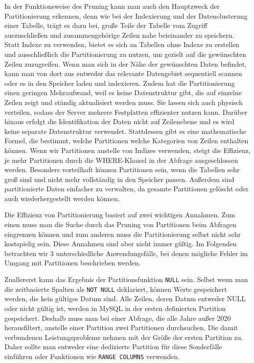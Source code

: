 In der Funktionsweise des Pruning kann man auch den Hauptzweck der Partitionierung erkennen, denn wie bei der Indexierung und der Datenclusterung einer Tabelle, trägt es dazu bei, große Teile der Tabelle vom Zugriff auszuschließen und zusammengehörige Zeilen nahe beieinander zu speichern.
Statt Indexe zu verwenden, bietet es sich an Tabellen ohne Indexe zu erstellen und ausschließlich die Partitionierung zu nutzen, um gezielt auf die gewünschten Zeilen zuzugreifen.
Wenn man sich in der Nähe der gewünschten Daten befindet, kann man von dort aus entweder das relevante Datengebiet sequentiell scannen oder es in den Speicher laden und indexieren.
Zudem hat die Partitionierung einen geringen Mehraufwand, weil es keine Datenstruktur gibt, die auf einzelne Zeilen zeigt und ständig aktualisiert werden muss.
Sie lassen sich auch physisch verteilen, sodass der Server mehrere Festplatten effizienter nutzen kann.
Darüber hinaus erfolgt die Identifikation der Daten nicht auf Zeilenebene und es wird keine separate Datenstruktur verwendet.
Stattdessen gibt es eine mathematische Formel, die bestimmt, welche Partitionen welche Kategorien von Zeilen enthalten können.
Wenn wir Partitionen anstelle von Indizes verwenden, steigt die Effizienz, je mehr Partitionen durch die WHERE-Klausel in der Abfrage ausgeschlossen werden.
Besonders vorteilhaft können Partitionen sein, wenn die Tabellen sehr groß sind und nicht mehr vollständig in den Speicher passen.
Außerdem sind partitionierte Daten einfacher zu verwalten, da gesamte Partitionen gelöscht oder auch wiederhergestellt werden können.

Die Effizienz von Partitionierung basiert auf zwei wichtigen Annahmen.
Zum einen muss man die Suche durch das Pruning von Partitionen beim Abfragen eingrenzen können und zum anderen muss die Partitionierung selbst nicht sehr kostspielig sein.
Diese Annahmen sind aber nicht immer gültig.
Im Folgenden betrachten wir 3 unterschiedliche Anwendungsfälle, bei denen mögliche Fehler im Umgang mit Partitionen beschrieben werden.

Zuallererst kann das Ergebnis der Partitionsfunktion \texttt{NULL} sein.
Selbst wenn man die zeitbasierte Spalten als \texttt{NOT NULL} deklariert, können Werte gespeichert werden, die kein gültiges Datum sind.
Alle Zeilen, deren Datum entweder NULL oder nicht gültig ist, werden in MySQL in der ersten definierten Partition gespeichert.
Deshalb muss man bei einer Abfrage, die alle Jahre außer 2020 herausfiltert, anstelle einer Partition zwei Partitionen durchsuchen.
Die damit verbundenen Leistungsprobleme nehmen mit der Größe der ersten Partition zu.
Daher sollte man entweder eine dedizierte Partition für diese Sonderfälle einführen oder Funktionen wie \texttt{RANGE COLUMNS} verwenden.

